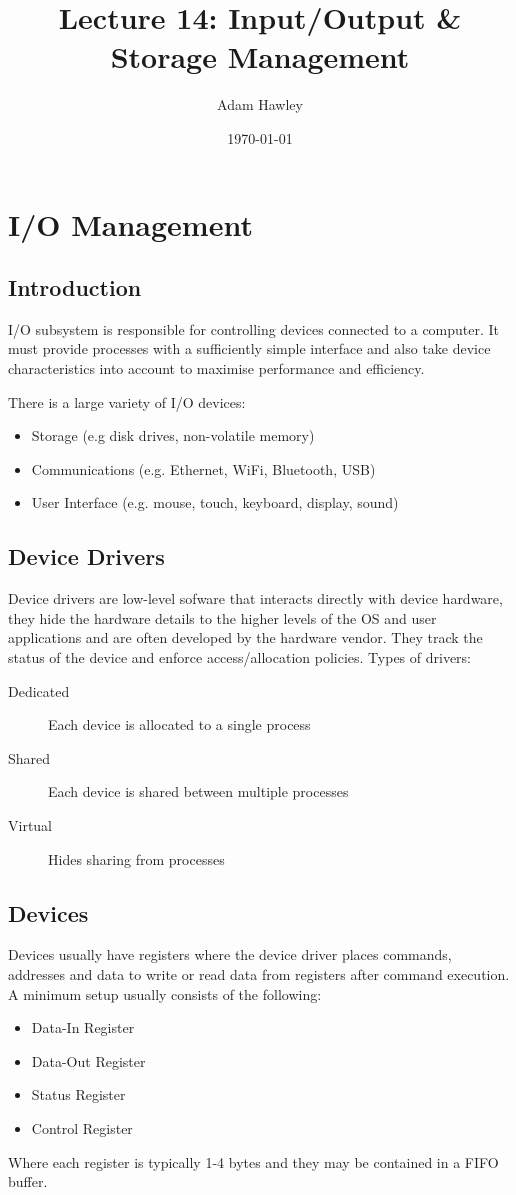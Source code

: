 \documentclass[11pt]{article}
\author{Adam Hawley}
\date{\today}
\title{Lecture 14: Input/Output \& Storage Management}
\begin{document}
\maketitle
\tableofcontents


\section{I/O Management}
\label{sec:org77343b9}
\subsection{Introduction}
\label{sec:org0a60547}
I/O subsystem is responsible for controlling devices connected to a computer.
It must provide processes with a sufficiently simple interface and also take device characteristics into account to maximise performance and efficiency.

There is a large variety of I/O devices:
\begin{itemize}
\item Storage (e.g disk drives, non-volatile memory)
\item Communications (e.g. Ethernet, WiFi, Bluetooth, USB)
\item User Interface (e.g. mouse, touch, keyboard, display, sound)
\end{itemize}

\subsection{Device Drivers}
\label{sec:org6e0e9a8}
Device drivers are low-level sofware that interacts directly with device hardware, they hide the hardware details to the higher levels of the OS and user applications and are often developed by the hardware vendor.
They track the status of the device and enforce access/allocation policies.
Types of drivers:
\begin{description}
\item[{Dedicated}] Each device is allocated to a single process
\item[{Shared}] Each device is shared between multiple processes
\item[{Virtual}] Hides sharing from processes
\end{description}
\subsection{Devices}
\label{sec:orgdf84688}
Devices usually have registers where the device driver places commands, addresses and data to write or read data from registers after command execution.
A minimum setup usually consists of the following:
\begin{itemize}
\item Data-In Register
\item Data-Out Register
\item Status Register
\item Control Register
\end{itemize}
Where each register is typically 1-4 bytes and they may be contained in a FIFO buffer.
\end{document}
